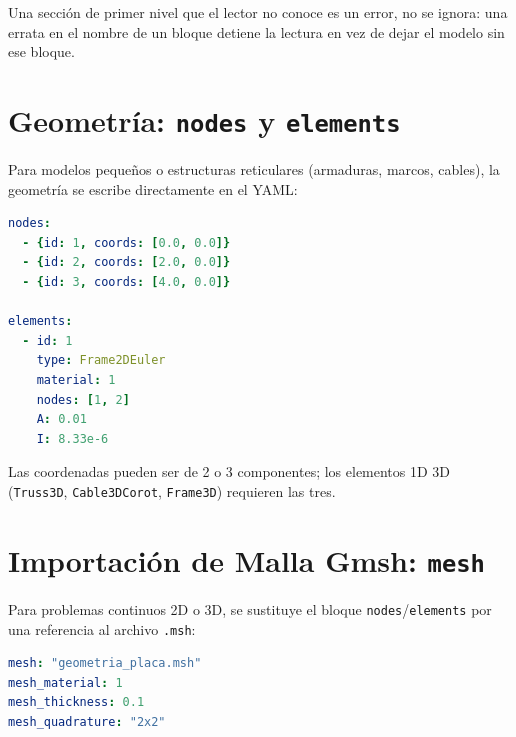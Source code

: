 \documentclass[11pt,oneside]{report}
\begin{document}
Una sección de primer nivel que el lector no conoce es un error, no se ignora: una errata en el nombre de un bloque detiene la lectura en vez de dejar el modelo sin ese bloque.

\section{Geometría: \texttt{nodes} y \texttt{elements}}

Para modelos pequeños o estructuras reticulares (armaduras, marcos, cables), la geometría se escribe directamente en el YAML:

\begin{lstlisting}[language=yaml]
nodes:
  - {id: 1, coords: [0.0, 0.0]}
  - {id: 2, coords: [2.0, 0.0]}
  - {id: 3, coords: [4.0, 0.0]}

elements:
  - id: 1
    type: Frame2DEuler
    material: 1
    nodes: [1, 2]
    A: 0.01
    I: 8.33e-6

\end{lstlisting}

Las coordenadas pueden ser de 2 o 3 componentes; los elementos 1D 3D (\texttt{Truss3D}, \texttt{Cable3DCorot}, \texttt{Frame3D}) requieren las tres.

\section{Importación de Malla Gmsh: \texttt{mesh}}

Para problemas continuos 2D o 3D, se sustituye el bloque \texttt{nodes}/\texttt{elements} por una referencia al archivo \texttt{.msh}:

\begin{lstlisting}[language=yaml]
mesh: "geometria_placa.msh"
mesh_material: 1
mesh_thickness: 0.1
mesh_quadrature: "2x2"

\end{lstlisting}
\end{document}
